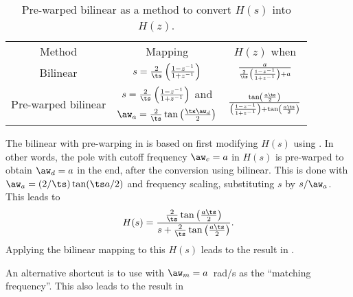 \begin{table}
\begin{center}	
	\caption{Pre-warped bilinear as a method to convert $H(s)$ into $H(z)$.\label{tab:HsIntoHz_prewarped}}
\begin{tabular}{|c|c|c|}
\hline
\multirow{2}{*}{Method} & \multirow{2}{*}{Mapping} & \multirow{2}{*}{$H(z)$ when} \\
       &         & $H(s)=\frac{a}{s+a}$ \\ \hline
Bilinear & $s=\frac{2}{\ts}\left(\frac{1-z^{-1}}{1+z^{-1}}\right)$ & $\frac{a}{\frac{2}{\ts}\left(\frac{1-z^{-1}}{1+z^{-1}}\right)+a}$ \\ \hline
\multirow{2}{*}{Pre-warped bilinear} & $s=\frac{2}{\ts}\left(\frac{1-z^{-1}}{1+z^{-1}}\right)$ and & \multirow{2}{*}{$\frac{ \tan\left(\frac{a \ts}{2}\right)}{\left(\frac{1-z^{-1}}{1+z^{-1}}\right)+\tan\left(\frac{a \ts}{2}\right)}$} \\
& $\aw_a = \frac{2}{\ts} \tan \left( \frac{\ts \aw_d}{2} \right)$ &  \\ \hline
\end{tabular}
\end{center}
\end{table}

The bilinear with pre-warping in  is based on first modifying $H(s)$ using
. In other words, the pole with cutoff frequency $\aw_c=a$ in $H(s)$ is pre-warped to obtain
$\aw_d = a$ in the end, after the conversion using bilinear. This is done with $\aw_a = (2/\ts) \tan(\ts a/2)$
and frequency scaling, substituting $s$ by $s/\aw_a$. This leads to
\[
H(s)=\frac{\frac{2}{\ts} \tan\left(\frac{a \ts}{2}\right)}{s+\frac{2}{\ts} \tan\left(\frac{a \ts}{2}\right)}.
\]
Applying the bilinear mapping to this $H(s)$ leads to the result in .

An alternative shortcut is to use  with $\aw_m = a$~rad/s as the ``matching frequency''.
This also leads to the result in  
\eExample 




